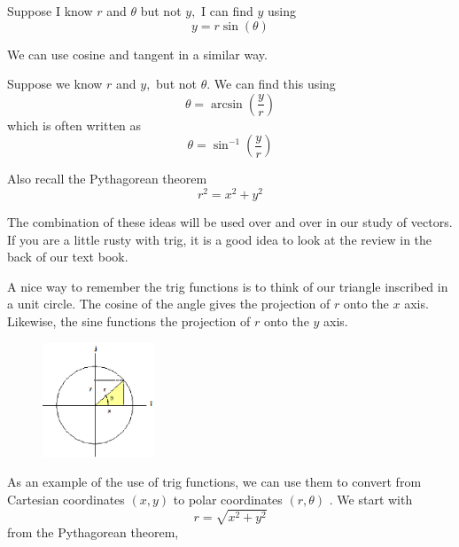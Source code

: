 \documentclass[]{Book}
\begin{document}
Suppose I know $r$ and $\theta $ but not $y,$ I can find $y$ using%
\begin{equation}
	y=r\sin \left( \theta \right)
\end{equation}

We can use cosine and tangent in a similar way.

Suppose we know $r$ and $y,$ but not $\theta .$ We can find this using%
\begin{equation}
	\theta =\arcsin \left( \frac{y}{r}\right)
\end{equation}%
which is often written as%
\begin{equation}
	\theta =\sin ^{-1}\left( \frac{y}{r}\right)
\end{equation}

Also recall the Pythagorean theorem%
\begin{equation}
	r^{2}=x^{2}+y^{2}
\end{equation}

The combination of these ideas will be used over and over in our study of
vectors. If you are a little rusty with trig, it is a good idea to look at
the review in the back of our text book.

A nice way to remember the trig functions is to think of our triangle
inscribed in a unit circle. The cosine of the angle gives the projection of $%
r$ onto the $x$ axis. Likewise, the sine functions the projection of $r$
onto the $y$ axis.

\begin{figure}[h!]
	\begin{center}
		\includegraphics[width=0.3\textwidth]{Unit_Circle}	
		\label{fig:Unit_Circle}
	\end{center}
\end{figure}

As an example of the use of trig functions, we can use them to convert from
Cartesian coordinates $(x,y)$ to polar coordinates $\left( r,\theta \right) $%
. We start with 
\begin{equation}
	r=\sqrt{x^{2}+y^{2}}
\end{equation}%
from the Pythagorean theorem,
\end{document}
